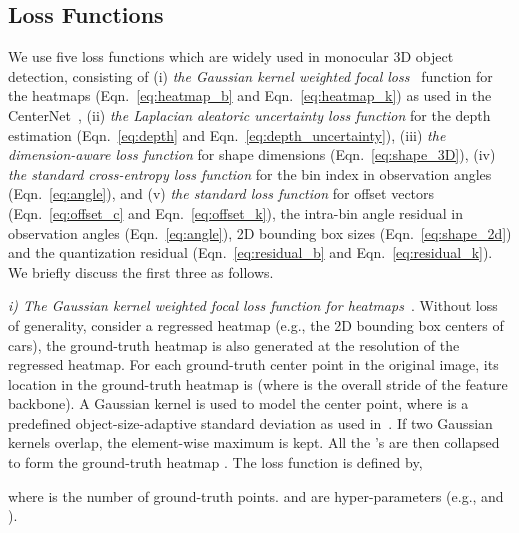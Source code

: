 \documentclass[letterpaper]{article} \usepackage{aaai22}  \usepackage{times}  \usepackage{helvet}  \usepackage{courier}  \usepackage[hyphens]{url}  \usepackage{graphicx} \urlstyle{rm} \def\UrlFont{\rm}  \usepackage{natbib}  \usepackage{caption} \DeclareCaptionStyle{ruled}{labelfont=normalfont,labelsep=colon,strut=off} \frenchspacing  \setlength{\pdfpagewidth}{8.5in}  \setlength{\pdfpageheight}{11in}  \usepackage{algorithm}
\begin{document}
\subsection{Loss Functions}
We use five loss functions which are widely used in monocular 3D object detection, consisting of (i) \textit{the Gaussian kernel weighted focal loss}~\cite{focalloss, cornernet} function for the heatmaps (Eqn.~\ref{eq:heatmap_b} and Eqn.~\ref{eq:heatmap_k}) as used in the CenterNet~\cite{centernet}, (ii) \textit{the Laplacian aleatoric uncertainty loss function }for the depth estimation (Eqn.~\ref{eq:depth} and Eqn.~\ref{eq:depth_uncertainty}), (iii)\textit{ the dimension-aware  loss function} for shape dimensions (Eqn.~\ref{eq:shape_3D}), (iv) \textit{the standard cross-entropy loss function} for the bin index in observation angles (Eqn.~\ref{eq:angle}), and (v)\textit{ the standard  loss function } for offset vectors (Eqn.~\ref{eq:offset_c} and Eqn.~\ref{eq:offset_k}),  the intra-bin angle residual in observation angles (Eqn.~\ref{eq:angle}), 2D bounding box sizes (Eqn.~\ref{eq:shape_2d}) and the quantization residual (Eqn.~\ref{eq:residual_b} and Eqn.~\ref{eq:residual_k}). We briefly discuss the first three as follows.  


\textit{i) The Gaussian kernel weighted focal loss function for heatmaps}~\cite{focalloss, cornernet,centernet}.  Without loss of generality, consider a regressed heatmap  (e.g., the 2D bounding box centers of cars), the ground-truth heatmap  is also generated at the resolution of the regressed heatmap. For each ground-truth center point  in the original image, its location in the ground-truth heatmap is  (where  is the overall stride of the feature backbone). A Gaussian kernel  is used to model the center point, where  is a predefined object-size-adaptive standard deviation as used in~\cite{cornernet}. If two Gaussian kernels overlap, the element-wise maximum is kept. All the 's are then collapsed to form the ground-truth heatmap . The loss function is defined by, 

where  is the number of ground-truth points.  and  are hyper-parameters (e.g.,  and ). 
\end{document}
